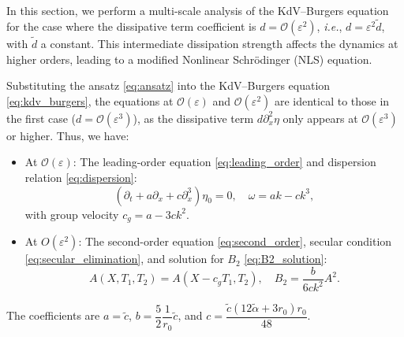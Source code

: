 \documentclass[alpha-refs, 12pt]{wiley-article}
\renewcommand{\O}{\mathcal{O}}
\newcommand{\eps}{\varepsilon}
\begin{document}
In this section, we perform a multi-scale analysis of the KdV--Burgers equation for the case where the dissipative term coefficient is $d = \O(\eps^2)$, \emph{i.e.}, $d = \eps^2 \tilde{d}$, with $\tilde{d}$ a constant. This intermediate dissipation strength affects the dynamics at higher orders, leading to a modified Nonlinear Schr\"odinger (NLS) equation. 

Substituting the ansatz \eqref{eq:ansatz} into the KdV--Burgers equation \eqref{eq:kdv_burgers}, the equations at $\O(\eps)$ and $\O(\eps^2)$ are identical to those in the first case ($d = \O(\eps^3)$), as the dissipative term $d \partial_x^2 \eta$ only appears at $\O(\eps^3)$ or higher. Thus, we have:
\begin{itemize}
    \item At $\O(\eps)$: The leading-order equation \eqref{eq:leading_order} and dispersion relation \eqref{eq:dispersion}:
    \[
    \left( \partial_t + a \partial_x + c \partial_x^3 \right) \eta_0 = 0, \quad \omega = a k - c k^3,
    \]
    with group velocity $c_g = a - 3 c k^2$.
    \item At $O(\eps^2)$: The second-order equation \eqref{eq:second_order}, secular condition \eqref{eq:secular_elimination}, and solution for $B_2$ \eqref{eq:B2_solution}:
    \[
    A(X, T_1, T_2) = A(X - c_g T_1, T_2), \quad B_2 = \frac{b}{6 c k^2} A^2.
    \]
\end{itemize}
The coefficients are $a = \tilde{c}$, $b = \dfrac{5}{2} \dfrac{1}{r_0} \tilde{c}$, and $c = \dfrac{\tilde{c} (12 \tilde{\alpha} + 3 r_0) r_0}{48}$.
\end{document}
